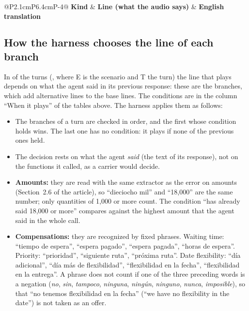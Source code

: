 \documentclass[11pt]{article}
\begin{document}
\begin{table}[H]
\centering
\caption{Interruption scenario: the lines that the harness plays over the agent.}
\label{tab:guion-int}
\footnotesize
\renewcommand{\arraystretch}{1.15}
\setlength{\tabcolsep}{4pt}
\begin{tabular}{@{}P{2.1cm}P{6.4cm}P{\dimexpr\linewidth-8.5cm-4\tabcolsep\relax}@{}}
\toprule
\textbf{Kind} & \textbf{Line (what the audio says)} & \textbf{English translation}\\
\midrule
\bottomrule
\end{tabular}
\end{table}

\subsection{How the harness chooses the line of each branch}
\label{sec:ramas}

In \RGuionTurnosConRamas{} of the \RGuionBase{} turns (\RGuionTurnosConRamasLista,
where E is the scenario and T the turn) the line that plays depends on what the
agent said in its previous response: these are the branches, which add
\RGuionAlt{} alternative lines to the \RGuionBase{} base lines. The conditions are
in the column ``When it plays'' of the tables above. The harness applies them as
follows:
\begin{itemize}[leftmargin=1.4cm]
  \item The branches of a turn are checked in order, and the first whose condition
  holds wins. The last one has no condition: it plays if none of the previous ones
  held.
  \item The decision rests on what the agent \emph{said} (the text of its
  response), not on the functions it called, as a carrier would decide.
  \item \textbf{Amounts:} they are read with the same extractor as the error on
  amounts (Section~2.6 of the article), so ``dieciocho mil'' and ``18,000'' are the
  same number; only quantities of 1,000 or more count. The condition ``has already
  said 18,000 or more'' compares against the highest amount that the agent said in
  the whole call.
  \item \textbf{Compensations:} they are recognized by fixed phrases. Waiting time:
  ``tiempo de espera'', ``espera pagado'', ``espera pagada'', ``horas de espera''.
  Priority: ``prioridad'', ``siguiente ruta'', ``próxima ruta''. Date flexibility:
  ``día adicional'', ``día más de flexibilidad'', ``flexibilidad en la fecha'',
  ``flexibilidad en la entrega''. A phrase does not count if one of the three
  preceding words is a negation (\emph{no}, \emph{sin}, \emph{tampoco},
  \emph{ninguna}, \emph{ningún}, \emph{ninguno}, \emph{nunca}, \emph{imposible}),
  so that ``no tenemos flexibilidad en la fecha'' (``we have no flexibility in the
  date'') is not taken as an offer.
\end{itemize}
\end{document}
